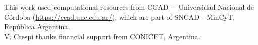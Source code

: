 \documentclass[baaa]{baaa}
\begin{document}
\begin{acknowledgement}
This work used computational resources from CCAD $-$ Universidad Nacional de Córdoba (\href{https://ccad.unc.edu.ar/}{https://ccad.unc.edu.ar/}), which are part of SNCAD - MinCyT, República Argentina. \\
V. Crespi thanks financial support from CONICET, Argentina.
\end{acknowledgement}



\small

 
\end{document}
